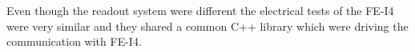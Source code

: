 Even though the readout system were different the electrical tests of the FE-I4 were very similar and they shared a common C++ library which were driving the communication with FE-I4.



